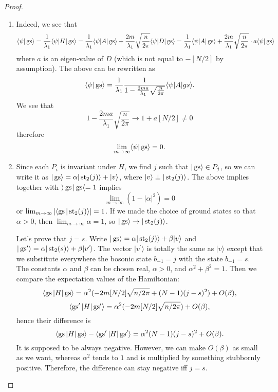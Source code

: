 \begin{proof}
\begin{enumerate}
\item Indeed, we see that
\[
\langle \psi | \operatorname{gs} \rangle = \frac{1}{\lambda_1} \langle \psi | H|\operatorname{gs}\rangle = \frac{1}{\lambda_1} \langle \psi |A|\operatorname{gs}\rangle + \frac{2m}{\lambda_1} \sqrt{\frac{n}{2\pi}} \langle \psi | D | \operatorname{gs} \rangle = \frac{1}{\lambda_1} \langle \psi |A|\operatorname{gs}\rangle + \frac{2m}{\lambda_1} \sqrt{\frac{n}{2\pi}} \cdot a \langle \psi | \operatorname{gs} \rangle
\]
where $a$ is an eigen-value of $D$ (which is not equal to $-[N/2]$ by assumption). The above can be rewritten as
\[
\langle \psi | \operatorname{gs}\rangle = \frac{1}{\lambda_1} \frac{1}{1- \frac{2ma}{\lambda_1}\sqrt{\frac{n}{2\pi}} } \langle \psi | A | gs\rangle.
\]
We see that 
\[
1- \frac{2ma}{\lambda_1}\sqrt{\frac{n}{2\pi}} \rightarrow 1 + a [N/2] \neq 0
\]
therefore
\[
\lim_{m \rightarrow \infty}\langle \psi | \operatorname{gs} \rangle = 0.
\]
\item Since each $P_i$ is invariant under $H$, we find $j$ such that $|\operatorname{gs} \rangle \in P_j$, so we can write it as $|\operatorname{gs}\rangle = \alpha |\operatorname{st}_2(j)\rangle + |v\rangle$, where $|v\rangle \perp |\operatorname{st}_2(j)\rangle$. The above implies together with $\rangle \operatorname{gs} | \operatorname{gs} \langle = 1$ implies
\[
\lim_{m \rightarrow \infty} (1 - |\alpha|^2) = 0
\]
or $\lim_{m \rightarrow \infty} |\langle \operatorname{gs} |\operatorname{st}_2(j)\rangle| = 1$. If we made the choice of ground states so that $\alpha > 0$, then $\lim_{m\rightarrow \infty} \alpha = 1$, so $|\operatorname{gs}\rangle \rightarrow |\operatorname{st}_2(j)\rangle$.

Let's prove that $j = s$. Write $|\operatorname{gs}\rangle = \alpha |\operatorname{st}_2(j)\rangle + \beta |v\rangle$ and $|\operatorname{gs}^\prime\rangle = \alpha |\operatorname{st}_2(s)\rangle + \beta |v^\prime \rangle$. The vector $|v^\prime \rangle$ is totally the same as $|v\rangle$ except that we substitute everywhere the bosonic state $b_{-1} = j$ with the state $b_{-1} = s$. The constants $\alpha$ and $\beta$ can be chosen real, $\alpha > 0$, and $\alpha^2+\beta^2 = 1$. Then we compare the expectation values of the Hamiltonian:
\[
\langle \operatorname{gs} | H|\operatorname{gs} \rangle  = \alpha^2 (-2m[N/2] \sqrt{n/2\pi} + (N-1)(j-s)^2) + O(\beta),
\]
\[
\langle \operatorname{gs}^\prime | H|\operatorname{gs}^\prime \rangle  = \alpha^2 (-2m[N/2] \sqrt{n/2\pi}) + O(\beta),
\]
hence their difference is
\[
\langle \operatorname{gs} | H|\operatorname{gs} \rangle - \langle \operatorname{gs}^\prime | H|\operatorname{gs}^\prime \rangle = \alpha^2(N-1)(j-s)^2 + O(\beta).
\]
It is supposed to be always negative. However, we can make $O(\beta)$ as small as we want, whereas $\alpha^2$ tends to $1$ and is multiplied by something stubbornly positive. Therefore, the difference can stay negative iff $j = s$.
\end{enumerate}
\end{proof}

